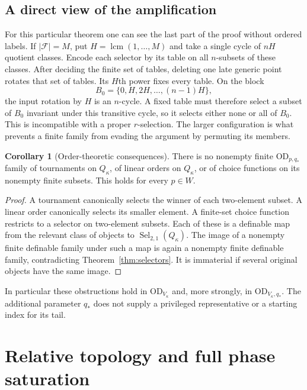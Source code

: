 \documentclass[11pt,letterpaper]{article}
\theoremstyle{definition}
\newtheorem{corollary}[definition]{Corollary}
\numberwithin{equation}{section}
\newcommand{\OD}{\mathrm{OD}}
\newcommand{\lcm}{\operatorname{lcm}}
\newcommand{\Sel}{\operatorname{Sel}}
\begin{document}
\subsection{A direct view of the amplification}

For this particular theorem one can see the last part of the proof without
ordered labels. If $|\mathscr F|=M$, put $H=\lcm(1,\ldots,M)$ and take a
single cycle of $nH$ quotient classes. Encode each selector by its table on
all $n$-subsets of these classes. After deciding the finite set of tables,
deleting one late generic point rotates that set of tables. Its $H$th
power fixes every table. On the block
\[
                         B_0=\{0,H,2H,\ldots,(n-1)H\},
\]
the input rotation by $H$ is an $n$-cycle. A fixed table must therefore
select a subset of $B_0$ invariant under this transitive cycle, so it selects
either none or all of $B_0$. This is incompatible with a proper $r$-selection.
The larger configuration is what prevents a finite family from evading the
argument by permuting its members.

\begin{corollary}[Order-theoretic consequences]\label{cor:orders}
There is no nonempty finite $\OD_{p,q_*}$ family of tournaments on
$Q_\kappa$, of linear orders on $Q_\kappa$, or of choice functions on its
nonempty finite subsets. This holds for every $p\in W$.
\end{corollary}

\begin{proof}
A tournament canonically selects the winner of each two-element subset.
A linear order canonically selects its smaller element. A finite-set
choice function restricts to a selector on two-element subsets. Each of
these is a definable map from the relevant class of objects to
$\Sel_{2,1}(Q_\kappa)$. The image of a nonempty finite definable family under
such a map is again a nonempty finite definable family, contradicting
Theorem~\ref{thm:selectors}. It is immaterial if several original objects
have the same image.
\end{proof}

In particular these obstructions hold in $\OD_{V_\kappa}$ and, more
strongly, in $\OD_{V_\kappa,q_*}$. The additional parameter $q_*$ does not
supply a privileged representative or a starting index for its tail.

\section{Relative topology and full phase saturation}\label{sec:topology}
\end{document}
